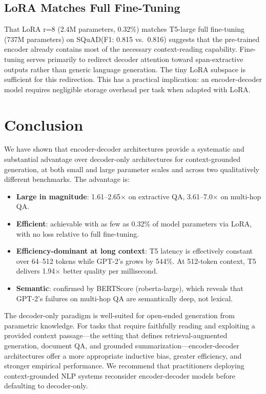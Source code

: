 \documentclass[11pt]{article}
\newcommand{\squad}{SQuAD\xspace}
\begin{document}
\subsection{LoRA Matches Full Fine-Tuning}

That LoRA r=8 (2.4M parameters, 0.32\%) matches T5-large full fine-tuning
(737M parameters) on \squad (F1: 0.815 vs.\ 0.816) suggests that the
pre-trained encoder already contains most of the necessary context-reading
capability.
Fine-tuning serves primarily to redirect decoder attention toward span-extractive
outputs rather than generic language generation.
The tiny LoRA subspace is sufficient for this redirection.
This has a practical implication: an encoder-decoder model requires negligible
storage overhead per task when adapted with LoRA.

\section{Conclusion}

We have shown that encoder-decoder architectures provide a systematic and
substantial advantage over decoder-only architectures for context-grounded
generation, at both small and large parameter scales and across two qualitatively
different benchmarks.
The advantage is:

\begin{itemize}
  \item \textbf{Large in magnitude}: 1.61--2.65$\times$ on extractive QA,
        3.61--7.0$\times$ on multi-hop QA.
  \item \textbf{Efficient}: achievable with as few as 0.32\% of model parameters
        via LoRA, with no loss relative to full fine-tuning.
  \item \textbf{Efficiency-dominant at long context}: T5 latency is effectively
        constant over 64--512 tokens while GPT-2's grows by 544\%.
        At 512-token context, T5 delivers 1.94$\times$ better quality per
        millisecond.
  \item \textbf{Semantic}: confirmed by BERTScore (roberta-large), which reveals
        that GPT-2's failures on multi-hop QA are semantically deep, not lexical.
\end{itemize}

The decoder-only paradigm is well-suited for open-ended generation from
parametric knowledge.
For tasks that require faithfully reading and exploiting a provided context
passage---the setting that defines retrieval-augmented generation, document QA,
and grounded summarization---encoder-decoder architectures offer a more
appropriate inductive bias, greater efficiency, and stronger empirical performance.
We recommend that practitioners deploying context-grounded NLP systems
reconsider encoder-decoder models before defaulting to decoder-only.



\end{document}
